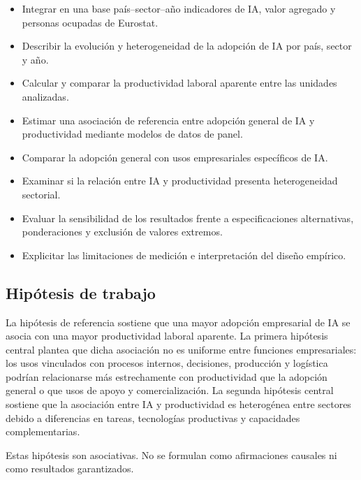 \documentclass[12pt,a4paper]{article}
\begin{document}
\begin{itemize}

  \item Integrar en una base país--sector--año indicadores de IA, valor agregado y personas ocupadas de Eurostat.

  \item Describir la evolución y heterogeneidad de la adopción de IA por país, sector y año.

  \item Calcular y comparar la productividad laboral aparente entre las unidades analizadas.

  \item Estimar una asociación de referencia entre adopción general de IA y productividad mediante modelos de datos de panel.

  \item Comparar la adopción general con usos empresariales específicos de IA.

  \item Examinar si la relación entre IA y productividad presenta heterogeneidad sectorial.

  \item Evaluar la sensibilidad de los resultados frente a especificaciones alternativas, ponderaciones y exclusión de valores extremos.

  \item Explicitar las limitaciones de medición e interpretación del diseño empírico.

\end{itemize}

\subsection{Hipótesis de trabajo}

La hipótesis de referencia sostiene que una mayor adopción empresarial de IA se asocia con una mayor productividad laboral aparente. La primera hipótesis central plantea que dicha asociación no es uniforme entre funciones empresariales: los usos vinculados con procesos internos, decisiones, producción y logística podrían relacionarse más estrechamente con productividad que la adopción general o que usos de apoyo y comercialización. La segunda hipótesis central sostiene que la asociación entre IA y productividad es heterogénea entre sectores debido a diferencias en tareas, tecnologías productivas y capacidades complementarias.

Estas hipótesis son asociativas. No se formulan como afirmaciones causales ni como resultados garantizados.
\end{document}
